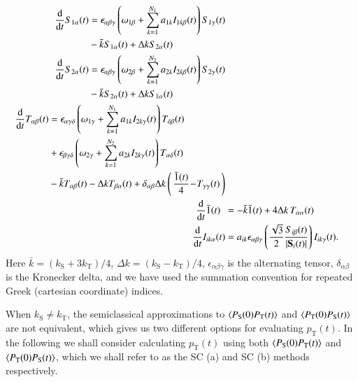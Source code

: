 \documentclass[%
aip,
jcp,%
amsmath,amssymb,
reprint%
]{revtex4-1}
\newcommand{\sing}{\ensuremath{\mathrm{S}}}
\newcommand{\trip}{\ensuremath{\mathrm{T}}}
\begin{document}
\begin{subequations}
  \begin{align}
    \begin{split}
      \dv{t}S_{1\alpha}(t) &= \epsilon_{\alpha\beta\gamma}\left( \omega_{1\beta} +\sum_{k=1}^{N_1}a_{1k}I_{1k\beta}(t) \right)S_{1\gamma}(t) \\
      &-\bar{k}S_{1\alpha}(t) +\Delta k S_{2\alpha}(t)
    \end{split}\\
    \begin{split}
      \dv{t}S_{2\alpha}(t) &= \epsilon_{\alpha\beta\gamma}\left( \omega_{2\beta} +\sum_{k=1}^{N_2}a_{2k}I_{2k\beta}(t) \right)S_{2\gamma}(t) \\
      &-\bar{k}S_{2\alpha}(t) +\Delta k S_{1\alpha}(t)
    \end{split}\\
     \begin{split}
      \dv{t}T_{\alpha\beta}(t) &= \epsilon_{\alpha\gamma\delta}\left( \omega_{1\gamma} +\sum_{k=1}^{N_1}a_{1k}I_{2k\gamma}(t) \right)T_{\delta\beta}(t) \\
      &+\epsilon_{\beta\gamma\delta}\left( \omega_{2\gamma} +\sum_{k=1}^{N_2}a_{2k}I_{2k\gamma}(t) \right)T_{\alpha\delta}(t) \\
      &-\bar{k}T_{\alpha\beta}(t)-\Delta k T_{\beta\alpha}(t) + \delta_{\alpha\beta}\Delta k\left(\,\frac{\bar{1}(t)}{4} \!-\! T_{\gamma\gamma}(t)\,\right)
    \end{split}\\
    \dv{t}\bar{1}(t)\phantom{x} &= -\bar{k}\bar{1}(t)+ 4\Delta k\,T_{\alpha\alpha}(t) \\
    \dv{t}I_{ik\alpha}(t) &= a_{ik} \epsilon_{\alpha\beta\gamma}\left(\frac{\sqrt{3}}{2}\frac{S_{i\beta}(t)}{|{\bf S}_i(t)|}\right)I_{ik\gamma}(t). \label{nuc-eom-eqn}
  \end{align}
\end{subequations}
Here $\bar{k} = (k_\sing+3k_\trip)/4$, $\Delta k = (k_\sing-k_\trip)/4$, $\epsilon_{\alpha\beta\gamma}$ is the alternating tensor, $\delta_{\alpha\beta}$ is the Kronecker delta, and we have used the summation convention for repeated Greek (cartesian coordinate) indices. 

When $k_\sing\neq k_\trip$, the semiclassical approximations to $\ev{P_\sing(0) P_\trip(t)}$ and $\ev{P_\trip(0) P_\sing(t)}$ are not equivalent, which gives us two different options for evaluating $p_\trip(t)$. In the following we shall consider calculating $p_\trip(t)$ using both $\ev{P_\sing(0) P_\trip(t)}$ and $\ev{P_\trip(0) P_\sing(t)}$, which we shall refer to as the SC (a) and SC (b) methods respectively. 
\end{document}
